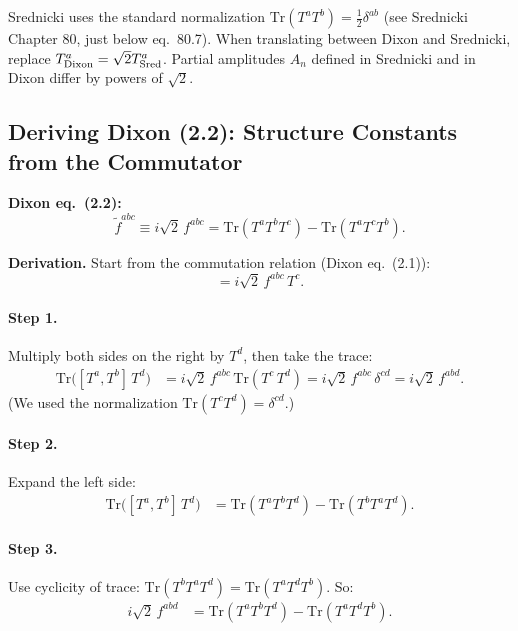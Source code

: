 \begin{remark}
Srednicki uses the standard normalization $\mathrm{Tr}(T^a T^b)=\tfrac{1}{2}\delta^{ab}$
(see Srednicki Chapter 80, just below eq.~80.7).
When translating between Dixon and Srednicki, replace $T^a_{\rm Dixon}=\sqrt{2}T^a_{\rm Sred}$.
Partial amplitudes $A_n$ defined in Srednicki and in Dixon differ by powers of $\sqrt{2}$.
\end{remark}

\subsection{Deriving Dixon (2.2): Structure Constants from the Commutator}
\label{sec:struct-const}

\textbf{Dixon eq.~(2.2):}
\begin{equation}\label{eq:dixon2.2}
  \tilde{f}^{abc} \equiv i\sqrt{2}\,f^{abc}
  = \mathrm{Tr}(T^a T^b T^c) - \mathrm{Tr}(T^a T^c T^b).
\end{equation}

\textbf{Derivation.} Start from the commutation relation (Dixon eq.~(2.1)):
\begin{equation}
  [T^a, T^b] = i\sqrt{2}\,f^{abc}\,T^c.
\end{equation}

\paragraph{Step 1.} Multiply both sides on the right by $T^d$, then take the trace:
\begin{align}
  \mathrm{Tr}\bigl([T^a,T^b]\,T^d\bigr)
  &= i\sqrt{2}\,f^{abc}\,\mathrm{Tr}(T^c\,T^d)
   = i\sqrt{2}\,f^{abc}\,\delta^{cd}
   = i\sqrt{2}\,f^{abd}.
\end{align}
(We used the normalization $\mathrm{Tr}(T^c T^d)=\delta^{cd}$.)

\paragraph{Step 2.} Expand the left side:
\begin{align}
  \mathrm{Tr}\bigl([T^a,T^b]\,T^d\bigr)
  &= \mathrm{Tr}(T^a T^b T^d) - \mathrm{Tr}(T^b T^a T^d).
\end{align}

\paragraph{Step 3.} Use cyclicity of trace: $\mathrm{Tr}(T^b T^a T^d)=\mathrm{Tr}(T^a T^d T^b)$.
So:
\begin{align}
  i\sqrt{2}\,f^{abd}
  &= \mathrm{Tr}(T^a T^b T^d) - \mathrm{Tr}(T^a T^d T^b).
\end{align}

